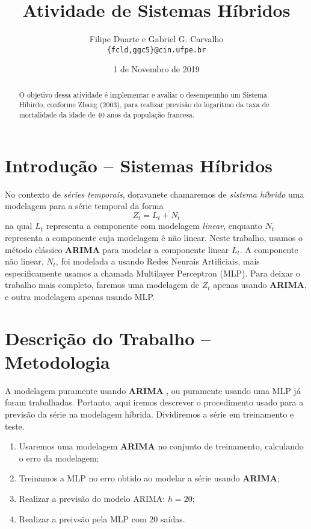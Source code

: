 \documentclass{article}
\title{Atividade de Sistemas Híbridos}
\author{Filipe Duarte e Gabriel G. Carvalho \\ \texttt{\{fcld,ggc5\}@cin.ufpe.br}}
\date{1 de Novembro de 2019}
\begin{document}
\maketitle
\begin{abstract}
O objetivo dessa atividade é implementar e avaliar o desempennho um Sistema Híbirdo, conforme Zhang (2003), para realizar previsão do logaritmo da taxa de mortalidade da idade de 40 anos da população francesa.

\end{abstract}
\maketitle

\section{Introdução -- Sistemas Híbridos}
No contexto de {\it séries temporais}, doravanete chamaremos de {\it sistema híbrido} uma modelagem para a série temporal da forma
\begin{equation}\label{hybriddef}
    Z_t = L_t + N_t
\end{equation}
na qual $L_t$ representa a componente com modelagem {\it linear}, enquanto $N_t$ representa a componente cuja modelagem é não linear.
Neste trabalho, usamos o método clássico {\bf ARIMA} para modelar a componente linear $L_t$. A componente não linear, $N_t$, foi modelada a usando Redes Neurais Artificiais, mais especificamente usamos a chamada Multilayer Perceptron (MLP). Para deixar o trabalho mais completo, faremos uma modelagem de $Z_t$ apenas usando {\bf ARIMA}, e outra modelagem apenas usando MLP.

\section{Descrição do Trabalho -- Metodologia}
A modelagem puramente usando {\bf ARIMA} , ou puramente usando uma MLP já foram trabalhadas. Portanto, aqui iremos descrever o procedimento usado para a previsão da série na modelagem híbrida. Dividiremos a série em treinamento e teste.
\begin{enumerate}
    \item Usaremos uma modelagem {\bf ARIMA} no conjunto de treinamento, calculando o erro da modelagem;
    \item Treinamos a MLP no erro obtido ao modelar a série usando {\bf ARIMA};
    \item Realizar a previsão do modelo {\vf ARIMA}: $h=20$;
    \item Realizar a preivsão pela MLP com $20$ saídas.
\end{enumerate}
\end{document}
